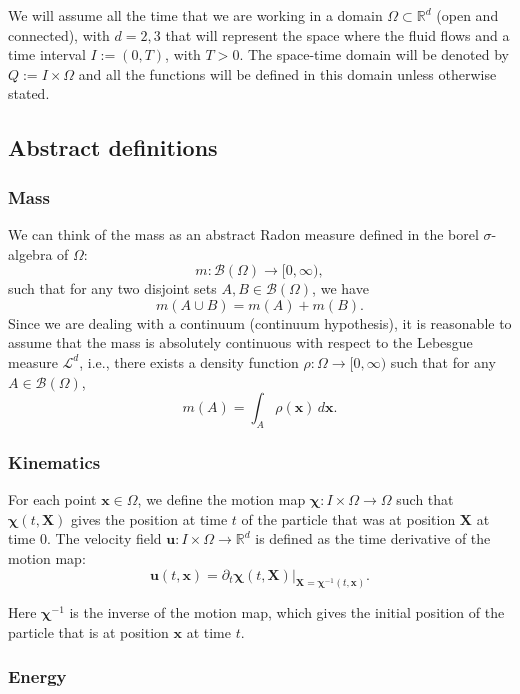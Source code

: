\documentclass{article}
\begin{document}
We will assume all the time that we are working in a domain $\Omega \subset \mathbb{R}^d$ (open and connected), with $d=2,3$ that will represent the space where the fluid flows and a time interval $I:=(0,T)$, with $T>0$. The space-time domain will be denoted by $Q:=I \times \Omega$ and all the functions will be defined in this domain unless otherwise stated.

\subsection{Abstract definitions}

\subsubsection{Mass}
We can think of the mass as an abstract Radon measure defined in the borel $\sigma$-algebra of $\Omega$:
\[
	m: \mathcal{B}(\Omega) \to [0, \infty),
\]
such that for any two disjoint sets $A, B \in \mathcal{B}(\Omega)$, we have
\[m(A \cup B) = m(A) + m(B).\]
Since we are dealing with a continuum (continuum hypothesis), it is reasonable to assume that the mass is absolutely continuous with respect to the Lebesgue measure $\mathcal{L}^d$, i.e., there exists a density function $\rho: \Omega \to [0, \infty)$ such that for any $A \in \mathcal{B}(\Omega)$,
\[m(A) = \int_A \rho(\bm{x}) \, d\bm{x}.\]

\subsubsection{Kinematics}
For each point $\bm{x} \in \Omega$, we define the motion map $\bm{\chi}: I \times \Omega \to \Omega$ such that $\bm{\chi}(t, \bm{X})$ gives the position at time $t$ of the particle that was at position $\bm{X}$ at time $0$. The velocity field $\bm{u}: I \times \Omega \to \mathbb{R}^d$ is defined as the time derivative of the motion map:
\[\bm{u}(t, \bm{x}) = \partial_t \bm{\chi}(t, \bm{X}) \big|_{\bm{X} = \bm{\chi}^{-1}(t, \bm{x})}.\]

Here $\bm\chi^{-1}$ is the inverse of the motion map, which gives the initial position of the particle that is at position $\bm{x}$ at time $t$.

\subsubsection{Energy}
\end{document}
